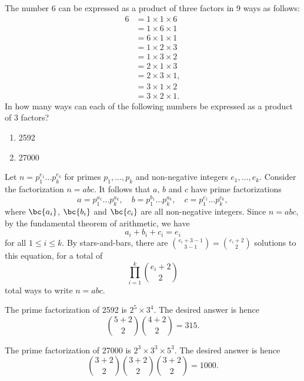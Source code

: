\begin{problem}
    The number 6 can be expressed as a product of three factors in 9 ways as follows:
    \begin{align*}
        6 &= 1 \times 1 \times 6\\
        &= 1 \times 6 \times 1\\
        &= 6 \times 1 \times 1\\
        &= 1 \times 2 \times 3\\
        &= 1 \times 3 \times 2\\
        &= 2 \times 1 \times 3\\
        &= 2 \times 3 \times 1,\\
        &= 3 \times 1 \times 2\\
        &= 3 \times 2 \times 1.
    \end{align*}
    In how many ways can each of the following numbers be expressed as a product of 3 factors?
    \begin{enumerate}
        \item 2592
        \item 27000
    \end{enumerate}
\end{problem}
\begin{solution}
    Let $n = p_1^{e_1} \dots p_k^{e_k}$ for primes $p_1, \dots, p_k$ and non-negative integers $e_1, \dots, e_k$. Consider the factorization $n = abc$. It follows that $a$, $b$ and $c$ have prime factorizations \[a = p_1^{a_1} \dots p_k^{a_k}, \quad b = p_1^{b_1} \dots p_k^{a_k}, \quad c = p_1^{c_1} \dots p_k^{c_k},\] where $\bc{a_i}$, $\bc{b_i}$ and $\bc{c_i}$ are all non-negative integers. Since $n = abc$, by the fundamental theorem of arithmetic, we have \[a_i + b_i + c_i = e_i\] for all $1 \leq i \leq k$. By stars-and-bars, there are $\binom{e_i + 3 - 1}{3-1} = \binom{e_i + 2}{2}$ solutions to this equation, for a total of \[\prod_{i = 1}^k \binom{e_i+2}{2}\] total ways to write $n = abc$.
    
    \begin{ppart}
        The prime factorization of 2592 is $2^5 \times 3^4$. The desired answer is hence \[\binom{5 + 2}{2} \binom{4+2}{2} = 315.\]
    \end{ppart}
    \begin{ppart}
        The prime factorization of 27000 is $2^3 \times 3^3 \times 5^3$. The desired answer is hence \[\binom{3+2}{2}\binom{3+2}{2}\binom{3+2}{2} = 1000.\]
    \end{ppart}
\end{solution}

